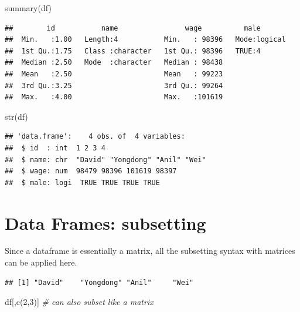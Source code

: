 \documentclass[
  11pt,
]{book}
\newenvironment{Shaded}{\begin{snugshade}}{\end{snugshade}}
\newcommand{\CommentTok}[1]{\textcolor[rgb]{0.56,0.35,0.01}{\textit{#1}}}
\newcommand{\DecValTok}[1]{\textcolor[rgb]{0.00,0.00,0.81}{#1}}
\newcommand{\FunctionTok}[1]{\textcolor[rgb]{0.00,0.00,0.00}{#1}}
\newcommand{\NormalTok}[1]{#1}
\newcommand{\SpecialCharTok}[1]{\textcolor[rgb]{0.00,0.00,0.00}{#1}}
\begin{document}
\begin{Shaded}
\begin{Highlighting}[]
\FunctionTok{summary}\NormalTok{(df)}
\end{Highlighting}
\end{Shaded}

\begin{verbatim}
##        id           name                wage          male        
##  Min.   :1.00   Length:4           Min.   : 98396   Mode:logical  
##  1st Qu.:1.75   Class :character   1st Qu.: 98396   TRUE:4        
##  Median :2.50   Mode  :character   Median : 98438                 
##  Mean   :2.50                      Mean   : 99223                 
##  3rd Qu.:3.25                      3rd Qu.: 99264                 
##  Max.   :4.00                      Max.   :101619
\end{verbatim}

\begin{Shaded}
\begin{Highlighting}[]
\FunctionTok{str}\NormalTok{(df)}
\end{Highlighting}
\end{Shaded}

\begin{verbatim}
## 'data.frame':    4 obs. of  4 variables:
##  $ id  : int  1 2 3 4
##  $ name: chr  "David" "Yongdong" "Anil" "Wei"
##  $ wage: num  98479 98396 101619 98397
##  $ male: logi  TRUE TRUE TRUE TRUE
\end{verbatim}

\hypertarget{data-frames-subsetting}{%
\section{Data Frames: subsetting}\label{data-frames-subsetting}}

Since a dataframe is essentially a matrix, all the subsetting syntax with matrices can be applied here.

\begin{Shaded}
\end{Shaded}

\begin{verbatim}
## [1] "David"    "Yongdong" "Anil"     "Wei"
\end{verbatim}

\begin{Shaded}
\begin{Highlighting}[]
\NormalTok{df[,}\FunctionTok{c}\NormalTok{(}\DecValTok{2}\NormalTok{,}\DecValTok{3}\NormalTok{)] }\CommentTok{\# can also subset like a matrix}
\end{Highlighting}
\end{Shaded}
\end{document}
